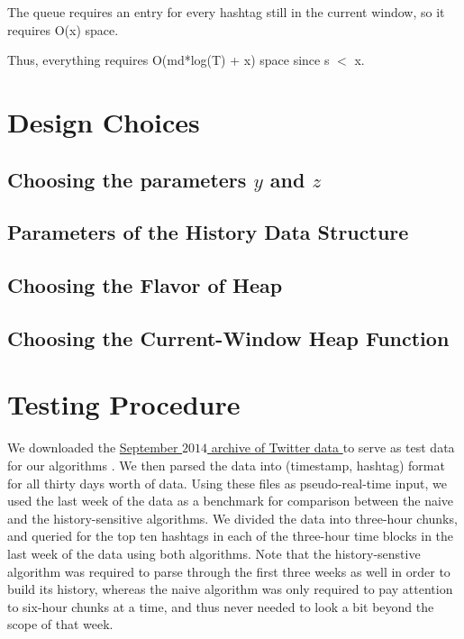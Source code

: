 \documentclass[twoside]{article}
\newcommand{\cc}[1]
 {\textbf{\cite{#1}}}
\begin{document}
The queue requires an entry for every hashtag still in the current window, so it requires O(x) space.

Thus, everything requires O(md*log(T) + x) space since s $<$ x.


\section{Design Choices}

\subsection{Choosing the parameters $y$ and $z$}


\subsection{Parameters of the History Data Structure}

\subsection{Choosing the Flavor of Heap}

\subsection{Choosing the Current-Window Heap Function}


\section{Testing Procedure}

We downloaded the \href{https://archive.org/details/twitterstream}{September $2014$ archive of Twitter data } to serve as test data for our algorithms \cc{Twitter2014}. We then parsed the data into (timestamp, hashtag) format
for all thirty days worth of data. Using these files as pseudo-real-time input, we used the last week of the data as a benchmark for comparison between the naive and the history-sensitive algorithms. We divided the data into three-hour chunks, and queried for the top ten hashtags in each of the three-hour time blocks
in the last week of the data using both algorithms. Note that the history-senstive algorithm was required to parse through the first three weeks as well in order to build its history, whereas the naive algorithm was only required to pay attention to six-hour chunks at a time, and thus never needed to look a bit beyond the scope of that week. 
\end{document}
